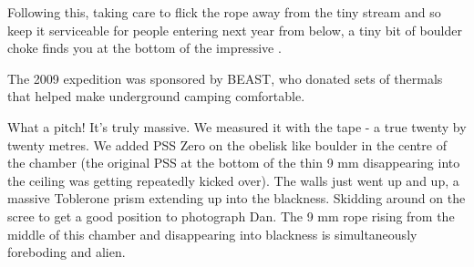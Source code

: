 Following this, taking care to flick the rope away from the tiny stream
and so keep it serviceable for people entering next year from below, a
tiny bit of boulder choke finds you at the bottom of the impressive
.


\begin{pagefigure}
\checkoddpage \ifoddpage \forcerectofloat \else \forceversofloat \fi
\centering
 \caption{The 2009 expedition was sponsored by BEAST, who donated sets of thermals that helped make underground camping comfortable. }
 \label{beast thermals}
\end{pagefigure}


What a pitch! It's truly massive. We measured it with the tape - a true
twenty by twenty metres. We added PSS Zero on the obelisk like boulder
in the centre of the chamber (the original PSS at the bottom of the thin
9 mm disappearing into the ceiling was getting repeatedly kicked over).
The walls just went up and up, a massive Toblerone prism extending up
into the blackness. Skidding around on the scree to get a good position
to photograph Dan. The 9 mm rope rising from the middle of this chamber
and disappearing into blackness is simultaneously foreboding and alien.

